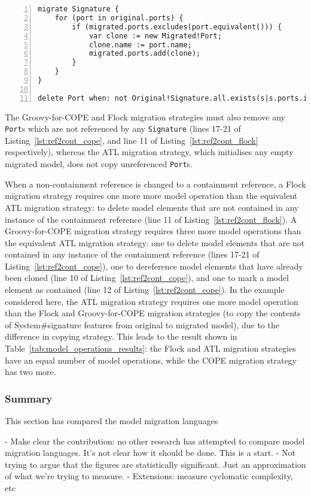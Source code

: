\begin{lstlisting}[basicstyle=\ttfamily\footnotesize, flexiblecolumns=true, numbers=left, nolol=true, caption=Change R to C model migration in Flock, label=lst:ref2cont_flock, language=Flock, tabsize=2]
migrate Signature {
	for (port in original.ports) {
		if (migrated.ports.excludes(port.equivalent())) {
			var clone := new Migrated!Port;
			clone.name := port.name;
			migrated.ports.add(clone);
		}
	}
}

delete Port when: not Original!Signature.all.exists(s|s.ports.includes(original))
\end{lstlisting}


The Groovy-for-COPE and Flock migration strategies must also remove any \texttt{Port}s which are not referenced by any \texttt{Signature} (lines 17-21 of Listing~\ref{lst:ref2cont_cope}, and line 11 of Listing~\ref{lst:ref2cont_flock} respectively), whereas the ATL migration strategy, which initialises any empty migrated model, does not copy unreferenced \texttt{Port}s.

When a non-containment reference is changed to a containment reference, a Flock migration strategy requires one more more model operation than the equivalent ATL migration strategy: to delete model elements that are not contained in any instance of the containment reference (line 11 of Listing~\ref{lst:ref2cont_flock}). A Groovy-for-COPE migration strategy requires three more model operations than the equivalent ATL migration strategy: one to delete model elements that are not contained in any instance of the containment reference (lines 17-21 of Listing~\ref{lst:ref2cont_cope}), one to dereference model elements that have already been cloned (line 10 of Listing~\ref{lst:ref2cont_cope}), and one to mark a model element as contained (line 12 of Listing~\ref{lst:ref2cont_cope}).  In the example considered here, the ATL migration strategy requires one more model operation than the Flock and Groovy-for-COPE migration strategies (to copy the contents of System\#signature features from original to migrated model), due to the difference in copying strategy. This leads to the result shown in Table~\ref{tab:model_operations_results}: the Flock and ATL migration strategies have an equal number of model operations, while the COPE migration strategy has two more.


\subsubsection{Summary}
This section has compared the model migration languages

- Make clear the contribution: no other research has attempted to compare model migration languages. It's not clear how it should be done. This is a start. 
- Not trying to argue that the figures are statistically significant. Just an approximation of what we're trying to measure.
- Extensions: measure cyclomatic complexity, etc
